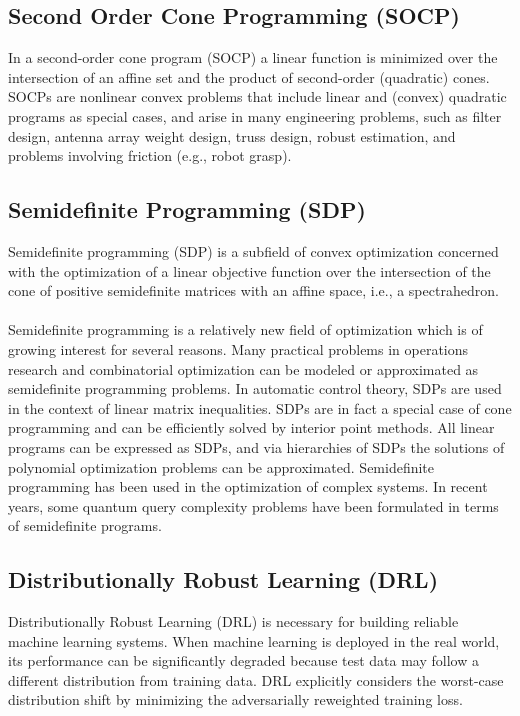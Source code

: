 \documentclass[12pt]{article}
\begin{document}
    \subsection{Second Order Cone Programming (SOCP)}
    In a second-order cone program (SOCP) a linear function is minimized over the intersection of an affine set and the product of second-order (quadratic) cones. SOCPs are nonlinear convex problems that include linear and (convex) quadratic programs as special cases, and arise in many engineering problems, such as filter design, antenna array weight design, truss design, robust estimation, and problems involving friction (e.g., robot grasp).
    \subsection{Semidefinite Programming (SDP)}
    Semidefinite programming (SDP) is a subfield of convex optimization concerned with the optimization of a linear objective function over the intersection of the cone of positive semidefinite matrices with an affine space, i.e., a spectrahedron. \\ \\
Semidefinite programming is a relatively new field of optimization which is of growing interest for several reasons. Many practical problems in operations research and combinatorial optimization can be modeled or approximated as semidefinite programming problems. In automatic control theory, SDPs are used in the context of linear matrix inequalities. SDPs are in fact a special case of cone programming and can be efficiently solved by interior point methods. All linear programs can be expressed as SDPs, and via hierarchies of SDPs the solutions of polynomial optimization problems can be approximated. Semidefinite programming has been used in the optimization of complex systems. In recent years, some quantum query complexity problems have been formulated in terms of semidefinite programs. \newpage
    \subsection{Distributionally Robust Learning (DRL)}
    Distributionally Robust Learning (DRL) is necessary for building reliable machine learning systems. When machine learning is deployed in the real world, its performance can be significantly degraded because test data may follow a different distribution from training data. DRL explicitly considers the worst-case distribution shift by minimizing the adversarially reweighted training loss. 
    
\end{document}
